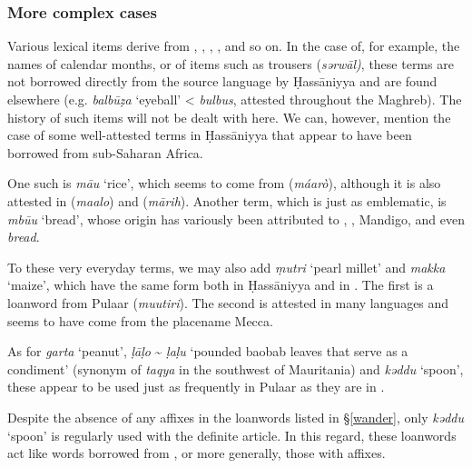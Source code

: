 \documentclass[output=paper]{langsci/langscibook}
\begin{document}
\subsubsection{More complex cases} %

 \label{wander}

Various  lexical items derive from , , , , and so on. In the case of, for example, the names of calendar months, or of items such as trousers (\textit{sərwāl)}, these terms are not borrowed directly from the {source language} by Ḥassāniyya and are found elsewhere (e.g. \textit{balbūẓa} ‘eyeball’ <  \textit{bulbus}, attested throughout the Maghreb). The history of such items will not be dealt with here. We can, however, mention the case of some well-attested terms in Ḥassāniyya that appear to have been borrowed from sub-Saharan Africa.

One such is \textit{mā{\R}u} ‘rice’, which seems to come from  (\textit{máarò}), although it is also attested in  (\textit{maalo}) and  (\textit{mārih}). Another term, which is just as emblematic, is \textit{mbū{\R}u} ‘bread’, whose origin has variously been attributed to , , Mandigo, and even  \textit{bread}.

To these very everyday terms, we may also add \textit{ṃutri} ‘pearl millet’ and \textit{makka} ‘maize’, which have the same form both in Ḥassāniyya and in . The first is a {loanword} from Pulaar (\textit{muutiri}). The second is attested in many languages and seems to have come from the placename {Mecca}. 

As for \textit{garta} ‘peanut’, \textit{ḷāḷo} \~{} \textit{ḷaḷu} ‘pounded baobab leaves that serve as a condiment’ (synonym of \textit{taqya} in the southwest of Mauritania) and \textit{kəddu} ‘spoon’, these appear to be used just as frequently in Pulaar as they are in . 


Despite the absence of any  affixes in the {loanwords} listed in §\ref{wander}, only \textit{kəddu} ‘spoon’ is regularly used with the {definite} {article}. In this regard, these {loanwords} act like words borrowed from , or more generally, those with  affixes. 
\end{document}
